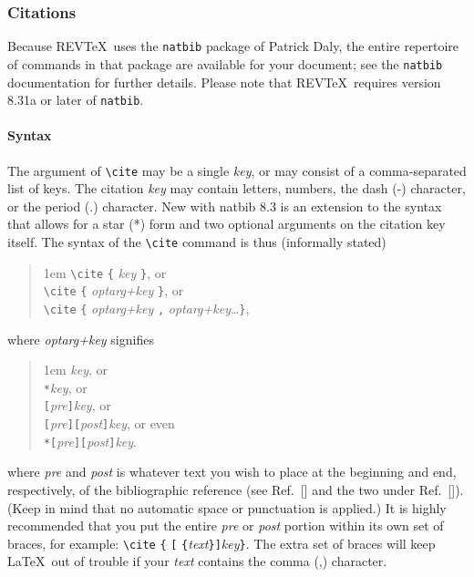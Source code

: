 \documentclass[%
 reprint,
 amsmath,amssymb,
 aps,
]{revtex4-2}
\begin{document}
\subsubsection{Citations}
Because REV\TeX\ uses the \verb+natbib+ package of Patrick Daly, 
the entire repertoire of commands in that package are available for your document;
see the \verb+natbib+ documentation for further details. Please note that
REV\TeX\ requires version 8.31a or later of \verb+natbib+.

\paragraph{Syntax}
The argument of \verb+\cite+ may be a single \emph{key}, 
or may consist of a comma-separated list of keys.
The citation \emph{key} may contain 
letters, numbers, the dash (-) character, or the period (.) character. 
New with natbib 8.3 is an extension to the syntax that allows for 
a star (*) form and two optional arguments on the citation key itself.
The syntax of the \verb+\cite+ command is thus (informally stated)
\begin{quotation}\flushleft\leftskip1em
\verb+\cite+ \verb+{+ \emph{key} \verb+}+, or\\
\verb+\cite+ \verb+{+ \emph{optarg+key} \verb+}+, or\\
\verb+\cite+ \verb+{+ \emph{optarg+key} \verb+,+ \emph{optarg+key}\ldots \verb+}+,
\end{quotation}\noindent
where \emph{optarg+key} signifies 
\begin{quotation}\flushleft\leftskip1em
\emph{key}, or\\
\texttt{*}\emph{key}, or\\
\texttt{[}\emph{pre}\texttt{]}\emph{key}, or\\
\texttt{[}\emph{pre}\texttt{]}\texttt{[}\emph{post}\texttt{]}\emph{key}, or even\\
\texttt{*}\texttt{[}\emph{pre}\texttt{]}\texttt{[}\emph{post}\texttt{]}\emph{key}.
\end{quotation}\noindent
where \emph{pre} and \emph{post} is whatever text you wish to place 
at the beginning and end, respectively, of the bibliographic reference
(see Ref.~[] and the two under Ref.~[]).
(Keep in mind that no automatic space or punctuation is applied.)
It is highly recommended that you put the entire \emph{pre} or \emph{post} portion 
within its own set of braces, for example: 
\verb+\cite+ \verb+{+ \texttt{[} \verb+{+\emph{text}\verb+}+\texttt{]}\emph{key}\verb+}+.
The extra set of braces will keep \LaTeX\ out of trouble if your \emph{text} contains the comma (,) character.
\end{document}
